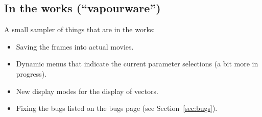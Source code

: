 \subsection{In the works (``vapourware'')}
\label{sec:vapourware}

A small sampler of things that are in the works:

\begin{itemize}
  \item Saving the frames into actual movies.
  \item Dynamic menus that indicate the current parameter selections
    (a bit more in progress).
  \item New display modes for the display of vectors.
  \item Fixing the bugs listed on the bugs page (see
    Section~\ref{sec:bugs}).
\end{itemize}



